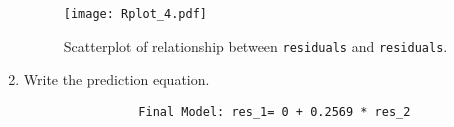 \documentclass[12pt,letterpaper]{article}
\begin{document}
\begin{enumerate}
\begin{figure}[h!]
			\caption{\footnotesize Scatterplot of relationship between \texttt{residuals} and \texttt{residuals}.}
			\label{fig:Rplot_4}
			\texttt{[image: Rplot\_4.pdf]}
			
		\end{figure}
		\newpage
		\item Write the prediction equation.
		
		\vspace{.15cm}
		 
		\vspace{.15cm}
		\begin{footnotesize}
			\begin{verbatim}
				Final Model: res_1= 0 + 0.2569 * res_2
			\end{verbatim}
		\end{footnotesize}	
		
	\end{enumerate}
	
\vspace{.5cm}
\end{document}
